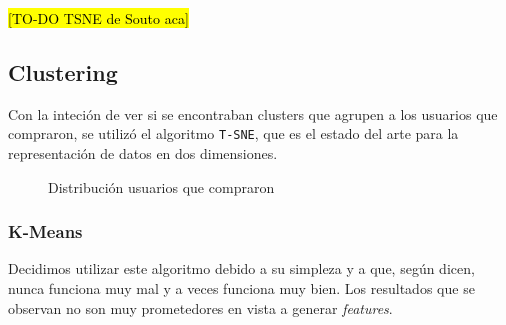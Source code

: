 \documentclass[a4paper]{article}
\begin{document}
\hl{[TO-DO TSNE de Souto aca]}
\subsection{Clustering}

Con la inteción de ver si se encontraban clusters que agrupen a los usuarios que compraron, se utilizó el algoritmo \texttt{T-SNE}, que es el estado del arte para la representación de datos en dos dimensiones.

\begin{figure}[!h]
	\caption{Distribución usuarios que compraron}
	\label{fig:mesdiasnormalizado}
\end{figure}

\subsubsection{K-Means}

Decidimos utilizar este algoritmo debido a su simpleza y a que, según dicen, nunca funciona muy mal y a veces funciona muy bien.
Los resultados que se observan no son muy prometedores en vista a generar \textit{features}.
\end{document}
